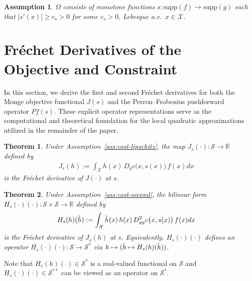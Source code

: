 \documentclass[12pt,leqno]{amsart}
\newtheorem{theorem}{Theorem}
\newtheorem{assumption}{Assumption}
\begin{document}
\begin{assumption}\label{ass:mono}
$\Omega$ consists of monotone functions $s:\mathrm{supp}(f)\to\mathrm{supp}(g)$ such that $|s'(x)|\ge c_s>0$ for some $c_s>0$, Lebesgue a.e.\ $x\in\mathcal{X}$.
\end{assumption}

\section{Fr\'echet Derivatives of the Objective and Constraint}\label{sec:deriv}
In this section, we derive the first and second Fr\'echet derivatives for both the Monge objective functional $J(s)$ and the Perron--Frobenius pushforward operator $Pf(s)$. These explicit operator representations serve as the computational and theoretical foundation for the local quadratic approximations utilized in the remainder of the paper.
\begin{theorem}\label{thm: J1deriv} 
    Under Assumption~\ref{ass:cost-lipschitz}, the map $J_s(\cdot): \mathcal{S}\rightarrow\mathbb{R}$ defined by
    \begin{align*}
        J_s(h) := \int_{\mathcal{X}}h(x)\, D_y c\big(x,s(x)\big)\, f(x)dx
    \end{align*}
    is the Fr\'echet derivative of $J(\cdot)$ at $s$. 
\end{theorem}

\begin{theorem}\label{thm: J2deriv} 
    Under Assumption~\ref{ass:cost-second}, the bilinear form $H_s(\cdot)(\cdot): \mathcal{S}\times\mathcal{S}\rightarrow\mathbb{R}$ defined by
    \begin{align*}
        H_s(h)(\Tilde{h}) :=\int_{\mathcal{X}}\Tilde{h}(x)\,h(x)\, D^2_{yy}c\big(x,s(x)\big)\, f(x)dx    
    \end{align*} 
    is the Fr\'echet derivative of $J_s(h)$ at $s$. Equivalently, $H_s(\cdot)(\cdot)$ defines an operator
    $H_s(\cdot)(\cdot):\mathcal{S}\to\mathcal{S}^*$ via $h\mapsto (\Tilde h\mapsto H_s(h)(\Tilde h))$.
\end{theorem}
Note that $H_s(h)(\cdot)\in\mathcal{S}^*$ is a real-valued functional on $\mathcal{S}$ and $H_s(\cdot)(\cdot)\in\mathcal{S}^{**}$ can be viewed as an operator on $\mathcal{S}^*$.
\end{document}
